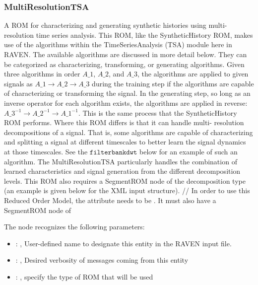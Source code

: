 \subsubsection{MultiResolutionTSA}
  A ROM for characterizing and generating synthetic histories using multi-resolution time
  series analysis. This ROM, like the SyntheticHistory ROM, makes use of the algorithms within the
  TimeSeriesAnalysis (TSA)       module here in RAVEN. The available algorithms are discussed in
  more detail below. They can be categorized as       characterizing, transforming, or generating
  algorithms. Given three algorithms in order $A\_1$, $A\_2$, and $A\_3$, the       algorithms are
  applied to given signals as $A\_1 \rightarrow A\_2 \rightarrow A\_3$ during the training step if the
  algorithms are capable of characterizing or transforming the signal. In the generating step, so
  long as an inverse       operator for each algorithm exists, the algorithms are applied in
  reverse: $A\_3^{-1} \rightarrow A\_2^{-1} \rightarrow A\_1^{-1}$.       This is the same process that
  the SyntheticHistory ROM performs. Where this ROM differs is that it can handle       multi-
  resolution decompositions of a signal. That is, some algorithms are capable of characterizing and
  splitting       a signal at different timescales to better learn the signal dynamics at those
  timescales. See the $\texttt{filterbankdwt}$       below for an example of such an algorithm. The
  MultiResolutionTSA particularly handles the combination of learned       characteristics and
  signal generation from the different decomposition levels. This ROM also requires a SegmentROM
  node of the decomposition type (an example is given below for the XML input structure).       //
  In order to use this Reduced Order Model, the  attribute  needs to
  be       . It must also have a SegmentROM node of 

  The  node recognizes the following parameters:
    \begin{itemize}
      \item {}: ,
        User-defined name to designate this entity in the RAVEN input file.
      \item {}: ,
        Desired verbosity of messages coming from this entity
      \item {}: ,
        specify the type of ROM that will be used
  \end{itemize}

